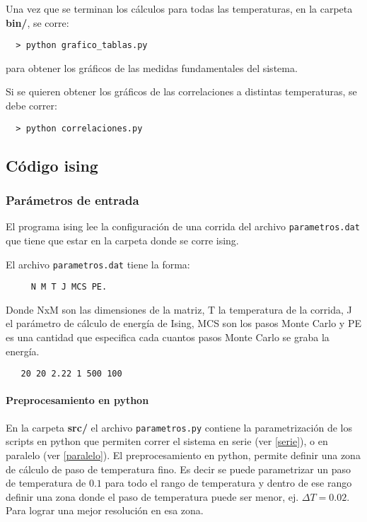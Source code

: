 Una vez que se terminan los cálculos para todas las temperaturas,  en 
la carpeta \textbf{bin/}, se corre:

\begin{verbatim}
  > python grafico_tablas.py 
\end{verbatim}

para obtener los gráficos de las medidas fundamentales del sistema.

Si se quieren obtener los gráficos de las correlaciones a distintas temperaturas, 
se debe correr:

\begin{verbatim}
  > python correlaciones.py 
\end{verbatim}



\subsection{C\'odigo ising}

\subsubsection{Par\'ametros de entrada}

El programa ising lee la configuraci\'on de una corrida del 
archivo \texttt{parametros.dat} que tiene que estar en la carpeta donde se
corre ising.

El archivo \texttt{parametros.dat} tiene la forma: 

\begin{verbatim}
     N M T J MCS PE. 
\end{verbatim}

Donde NxM 
son las dimensiones de la matriz, T la temperatura de la corrida,
J el par\'ametro de c\'alculo de energ\'ia de Ising, MCS son los pasos Monte Carlo y PE
es una cantidad que especifica cada cuantos pasos Monte Carlo se graba la energ\'ia.

\begin{verbatim}
   20 20 2.22 1 500 100
\end{verbatim}


\paragraph{Preprocesamiento en python}
En la carpeta \textbf{src/} el archivo \texttt{parametros.py} contiene la 
parametrizaci\'on de los scripts en python que permiten correr el sistema en 
serie (ver \eqref{serie}), 
o en paralelo (ver \eqref{paralelo}).
El preprocesamiento en python, permite definir una zona de c\'alculo de paso
de temperatura fino. Es decir se puede parametrizar un paso de temperatura de
$0.1$ para todo el rango de temperatura y dentro de ese rango definir una zona
donde el paso de temperatura puede ser menor, ej. $\Delta T = 0.02$. Para 
lograr una mejor resoluci\'on
en esa zona.

